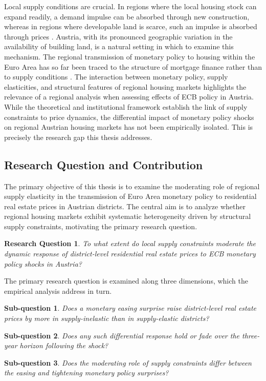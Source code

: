 \documentclass[a4paper,12pt, headsepline]{scrartcl}
\newtheorem*{mainrq}{Research Question}
\newtheorem{researchq}{Sub-question}
\numberwithin{equation}{section}
\begin{document}
Local supply conditions are crucial. In regions where the local housing stock can expand readily, a demand impulse can be absorbed through new construction, whereas in regions where developable land is scarce, such an impulse is absorbed through prices \citep{saiz2010, aastveit2022}. Austria, with its pronounced geographic variation in the availability of building land, is a natural setting in which to examine this mechanism. The regional transmission of monetary policy to housing within the Euro Area has so far been traced to the structure of mortgage finance rather than to supply conditions \citep{battistini2025}. The interaction between monetary policy, supply elasticities, and structural features of regional housing markets highlights the relevance of a regional analysis when assessing effects of ECB policy in Austria. While the theoretical and institutional framework establish the link of supply constraints to price dynamics, the differential impact of monetary policy shocks on regional Austrian housing markets has not been empirically isolated. This is precisely the research gap this thesis addresses.

\subsection{Research Question and Contribution}\label{subsec:rq}

The primary objective of this thesis is to examine the moderating role of regional supply elasticity in the transmission of Euro Area monetary policy to residential real estate prices in Austrian districts. The central aim is to analyze whether regional housing markets exhibit systematic heterogeneity driven by structural supply constraints, motivating the primary research question.

\begin{mainrq}\label{rq:main}
	To what extent do local supply constraints moderate the dynamic response of district-level residential real estate prices to ECB monetary policy shocks in Austria?
\end{mainrq}

The primary research question is examined along three dimensions, which the empirical analysis address in turn.

\begin{researchq}\label{rq:magnitude}
	Does a monetary easing surprise raise district-level real estate prices by more in supply-inelastic than in supply-elastic districts?
\end{researchq}
\begin{researchq}\label{rq:persistence}
	Does any such differential response hold or fade over the three-year horizon following the shock?
\end{researchq}
\begin{researchq}\label{rq:asymmetry}
	Does the moderating role of supply constraints differ between the easing and tightening monetary policy surprises?
\end{researchq}
\end{document}
